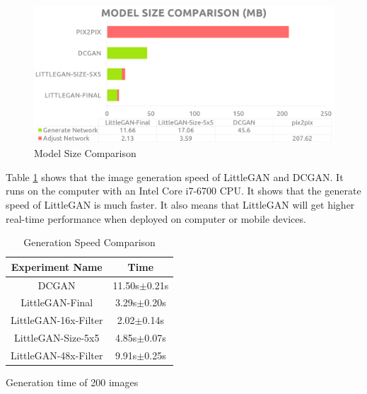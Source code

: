     \begin{figure}
        \begin{center}
        \includegraphics[width=\textwidth]{figures/result_model_size.png}
        \caption{Model Size Comparison}
        \label{result_model_size}
        \end{center}
    \end{figure}

Table \ref{result_speed} shows that the image generation speed of LittleGAN and DCGAN.
It runs on the computer with an Intel Core i7-6700 CPU.
It shows that the generate speed of LittleGAN is much faster.
It also means that LittleGAN will get higher real-time performance when deployed on computer or mobile devices.

    \begin{table}
        \caption{Generation Speed Comparison}
        \label{result_speed}
        \centering
        \begin{threeparttable}
            \begin{tabular}{c|c}
                \hline
                Experiment Name & Time       \\ \hline
                DCGAN        &  11.50s$\pm$0.21s\\
                LittleGAN-Final\tnote{*}        &  3.29s$\pm$0.20s\\
                LittleGAN-16x-Filter\tnote{*}        & 2.02$\pm$0.14s \\
                LittleGAN-Size-5x5\tnote{*}        &  4.85s$\pm$0.07s\\
                LittleGAN-48x-Filter\tnote{*}        & 9.91s$\pm$0.25s  \\ \hline
            \end{tabular}
            \begin{tablenotes}
                \item Generation time of 200 images
            \end{tablenotes}
        \end{threeparttable}
    \end{table}


